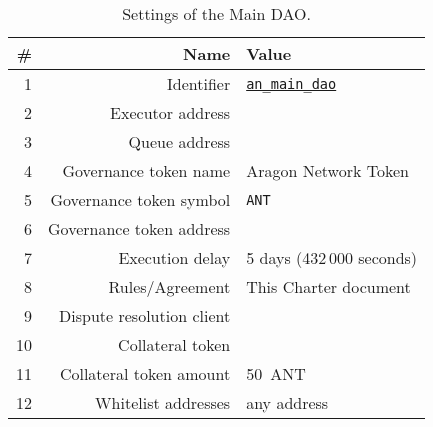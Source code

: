 
\label{chap:DAOParameters}


\begin{table}[h!]
	\caption{Settings of the Main DAO.}
	\centering
	\begin{tabular}{rrl}
		\toprule
		\# & Name & Value \\
		\midrule
		 1 & Identifier					& \href{https://govern.aragon.org/\#/daos/an_main_dao}{\texttt{an\_main\_dao}}\\
		 2 & Executor address			& \mainDaoAddr\\
		 3 & Queue address				& \mainDaoQueueAddr\\
		 4 & Governance token name		& Aragon Network Token\\
		 5 & Governance token symbol	& \texttt{\ac{ANT}}\\
		 6 & Governance token address	& \mainDaoTokenAddr\\
		 7 & Execution delay			& 5 days (432\,000 seconds)\\
		 8 & Rules/Agreement			& This Charter document\\
		 9 & Dispute resolution client	& \aragonCourtAddr\\
		10 & Collateral token			& \antTokenAddr\\
		11 & Collateral token amount	& 50~\ac{ANT}\\
		12 & Whitelist addresses 		& any address\\
		\bottomrule
	\end{tabular}
\end{table}



